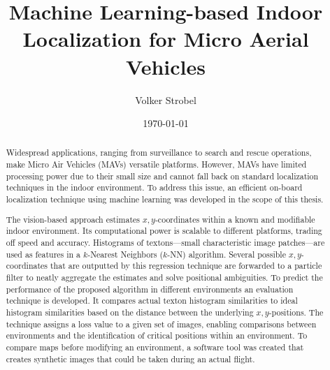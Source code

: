 \documentclass[11pt]{report}
\title{Machine Learning-based Indoor Localization for Micro
  Aerial Vehicles}
\author{Volker Strobel}
\date{\today}
\begin{document}
\maketitle
\begin{abstract}
  Widespread applications, ranging from surveillance to search and
  rescue operations, make Micro Air Vehicles (MAVs) versatile
  platforms. However, MAVs have limited processing power due to their
  small size and cannot fall back on standard localization techniques
  in the indoor environment.
  To address this issue, an efficient on-board
  localization technique using machine learning was developed in the
  scope of this thesis.

  The vision-based approach estimates $x,y$-coordinates within a known
  and modifiable indoor environment. Its computational power is
  scalable to different platforms, trading off speed and
  accuracy. Histograms of textons---small characteristic image
  patches---are used as features in a $k$-Nearest Neighbors ($k$-NN)
  algorithm. Several possible $x,y$-coordinates that are outputted by
  this regression technique are forwarded to a particle filter to
  neatly aggregate the estimates and solve positional ambiguities.
  To predict the performance of the proposed algorithm in different
  environments an evaluation technique is developed. It compares
  actual texton histogram similarities to ideal histogram similarities
  based on the distance between the underlying $x,y$-positions. The
  technique assigns a loss value to a given set of images, enabling
  comparisons between environments and the identification of critical
  positions within an environment. To compare maps before modifying an
  environment, a software tool was created that creates synthetic
  images that could be taken during an actual flight.




\end{abstract}
\end{document}
